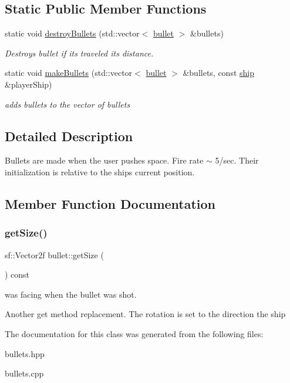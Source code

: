 \subsection*{Static Public Member Functions}
\begin{DoxyCompactItemize}
\item 
\mbox{\label{classbullet_a07761d314074a90cca0d7fb16b6edc6e}} 
static void \hyperlink{classbullet_a07761d314074a90cca0d7fb16b6edc6e}{destroy\+Bullets} (std\+::vector$<$ \hyperlink{classbullet}{bullet} $>$ \&bullets)
\begin{DoxyCompactList}\small\item\em Destroys bullet if it\textquotesingle{}s traveled its distance. \end{DoxyCompactList}\item 
\mbox{\label{classbullet_a0b5d94105467e91f70ad5561e82b94cd}} 
static void \hyperlink{classbullet_a0b5d94105467e91f70ad5561e82b94cd}{make\+Bullets} (std\+::vector$<$ \hyperlink{classbullet}{bullet} $>$ \&bullets, const \hyperlink{classship}{ship} \&player\+Ship)
\begin{DoxyCompactList}\small\item\em adds bullets to the vector of bullets \end{DoxyCompactList}\end{DoxyCompactItemize}


\subsection{Detailed Description}
Bullets are made when the user pushes space. Fire rate $\sim$ 5/sec. Their initialization is relative to the ship\textquotesingle{}s current position. 

\subsection{Member Function Documentation}
\mbox{\label{classbullet_a6e9ed12be7f5732751881ee72bbd55e5}} 
\subsubsection{\texorpdfstring{get\+Size()}{getSize()}}
{\footnotesize\ttfamily sf\+::\+Vector2f bullet\+::get\+Size (\begin{DoxyParamCaption}{ }\end{DoxyParamCaption}) const}



was facing when the bullet was shot. 

Another get method replacement. The rotation is set to the direction the ship 

The documentation for this class was generated from the following files\+:\begin{DoxyCompactItemize}
\item 
bullets.\+hpp\item 
bullets.\+cpp\end{DoxyCompactItemize}
